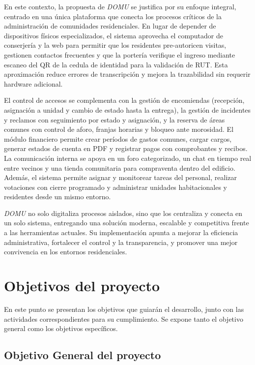En este contexto, la propuesta de \textit{DOMU} se justifica por su enfoque integral, centrado en una única plataforma que conecta los procesos críticos de la administración de comunidades residenciales. En lugar de depender de dispositivos físicos especializados, el sistema aprovecha el computador de conserjería y la web para permitir que los residentes pre-autoricen visitas, gestionen contactos frecuentes y que la portería verifique el ingreso mediante escaneo del QR de la cedula de identidad para la validación de RUT. Esta aproximación reduce errores de transcripción y mejora la trazabilidad sin requerir hardware adicional.

El control de accesos se complementa con la gestión de encomiendas (recepción, asignación a unidad y cambio de estado hasta la entrega), la gestión de incidentes y reclamos con seguimiento por estado y asignación, y la reserva de áreas comunes con control de aforo, franjas horarias y bloqueo ante morosidad. El módulo financiero permite crear períodos de gastos comunes, cargar cargos, generar estados de cuenta en PDF y registrar pagos con comprobantes y recibos. La comunicación interna se apoya en un foro categorizado, un chat en tiempo real entre vecinos y una tienda comunitaria para compraventa dentro del edificio. Además, el sistema permite asignar y monitorear tareas del personal, realizar votaciones con cierre programado y administrar unidades habitacionales y residentes desde un mismo entorno.

\textit{DOMU} no solo digitaliza procesos aislados, sino que los centraliza y conecta en un solo sistema, entregando una solución moderna, escalable y competitiva frente a las herramientas actuales. Su implementación apunta a mejorar la eficiencia administrativa, fortalecer el control y la transparencia, y promover una mejor convivencia en los entornos residenciales.

\section{Objetivos del proyecto}

En este punto se presentan los objetivos que guiarán el desarrollo, junto con las actividades correspondientes para su cumplimiento. Se expone tanto el objetivo general como los objetivos específicos.

\subsection{Objetivo General del proyecto}

